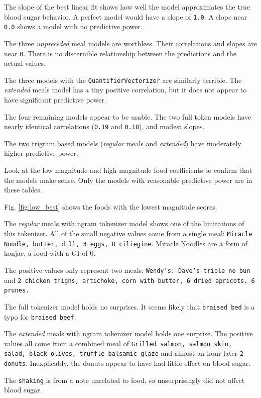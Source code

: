 \documentclass[conference]{IEEEtran}
\begin{document}
The slope of the best linear fit shows how well the model approximates the true blood sugar behavior. A perfect model would have a slope of \texttt{1.0}. A slope near \texttt{0.0} shows a model with no predictive power.

The three \emph{unpreceded} meal models are worthless. Their correlations and slopes are near \texttt{0}. There is no discernible relationship between the predictions and the actual values.

The three models with the \texttt{QuantifierVectorizer} are similarly terrible. The \emph{extended} meals model has a tiny positive correlation, but it does not appear to have significant predictive power.

The four remaining models appear to be usable. The two full token models have nearly identical correlations (\texttt{0.19} and \texttt{0.18}), and modest slopes.

The two trigram based models (\emph{regular} meals and \emph{extended}) have moderately higher predictive power.

Look at the low magnitude and high magnitude food coefficients to confirm that the models make sense. Only the models with reasonable predictive power are in these tables.

Fig. \ref{fig:low_best} shows the foods with the lowest magnitude scores.

The \emph{regular} meals with ngram tokenizer model shows one of the limitations of this tokenizer. All of the small negative values come from a single meal: \texttt{Miracle Noodle, butter, dill, 3 eggs, 8 ciliegine}. Miracle Noodles are a form of konjac, a food with a GI of 0.

The positive values only represent two meals: \texttt{Wendy's: Dave's triple no bun} and \texttt{2 chicken thighs, artichoke, corn with butter, 6 dried apricots. 6 prunes.}

The full tokenizer model holds no surprises. It seems likely that \texttt{braised bed} is a typo for \texttt{braised beef}.

The \emph{extended} meals with ngram tokenizer model holds one surprise. The positive values all come from a combined meal of \texttt{Grilled salmon, salmon skin, salad, black olives, truffle balsamic glaze} and almost an hour later \texttt{2 donuts}. Inexplicably, the donuts appear to have had little effect on blood sugar.

The \texttt{shaking} is from a note unrelated to food, so unsurprisingly did not affect blood sugar.
\end{document}
